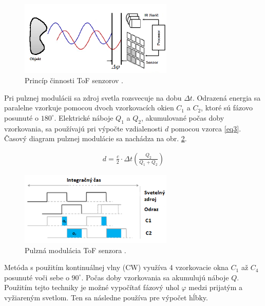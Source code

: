 \begin{figure}[h]
	\centering
	\includegraphics[width=0.65\textwidth]{figures/tof_principle.png} 
	\caption{Princíp činnosti ToF senzorov \cite{hansard2012time}.}
	\label{fig:tof_principle}
\end{figure}

Pri pulznej modulácii sa zdroj svetla rozsvecuje na dobu $\Delta t$. Odrazená energia sa paralelne vzorkuje pomocou dvoch vzorkovacích okien $C_1$ a $C_2$, ktoré sú fázovo posunuté o $180^\circ$. Elektrické náboje $Q_1$ a $Q_2$, akumulované počas doby vzorkovania, sa používajú pri výpočte vzdialenosti $d$ pomocou vzorca \ref{eq3}. Časový diagram pulznej modulácie sa nachádza na obr. \ref{fig:tof_principle_a}. 

\begin{equation}
\label{eq3}
\begin{aligned}
d=\frac{c}{2}\cdot\Delta t \left( \frac{Q_2}{Q_1 + Q_2}\right) 
\end{aligned}
\end{equation}


\begin{figure}[H]
	\centering
	\includegraphics[width=0.65\textwidth]{figures/tof_principle_a.png} 
	\caption{Pulzná modulácia ToF senzora \cite{li2014time}.}
	\label{fig:tof_principle_a}
\end{figure}

Metóda s použitím kontinuálnej vlny (CW) využíva 4 vzorkovacie okna $C_1$ až $C_4$ posunuté voči sebe o $90^\circ$. Počas doby vzorkovania sa akumulujú náboje $Q$. Použitím tejto techniky je možné vypočítať fázový uhol $\varphi$ medzi prijatým a vyžiareným svetlom. Ten sa následne používa pre výpočet hĺbky. 


